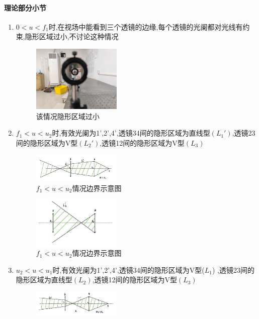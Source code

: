 \documentclass[UTF8]{gapd}
\begin{document}
\paragraph{理论部分小节}
\begin{enumerate}
  \item $0<u<f_1$时,在视场中能看到三个透镜的边缘,每个透镜的光阑都对光线有约束,隐形区域过小,不讨论这种情况
  \begin{figure}[htbp]
    \centering
    \includegraphics[width=0.4\textwidth]{images/11.jpg}
    \caption{该情况隐形区域过小}
    \label{fig:11}
  \end{figure}
  \item $f_1<u<u_2$时,有效光阑为1',2',4',透镜34间的隐形区域为直线型$(L_1')$,透镜23间的隐形区域为V型$(L_2')$,透镜12间的隐形区域为V型$(L_3)$
  \begin{figure}[htbp]
    \centering
    \includegraphics[width=0.4\textwidth]{images/12.jpg}
    \caption{$f_1<u<u_2$情况边界示意图}
    \label{fig:12}
  \end{figure}
  \begin{figure}[htbp]
    \centering
    \includegraphics[width=0.4\textwidth]{images/13.jpg}
    \caption{$f_1<u<u_2$情况边界示意图}
    \label{fig:13}
  \end{figure} 
  \item $u_2<u<u_1$时,有效光阑为1',2',4',透镜34间的隐形区域为V型($L_1$) ,透镜23间的隐形区域为直线型$(L_2)$,透镜12间的隐形区域为V型$(L_3)$
  \begin{figure}[htbp]
    \centering
    \includegraphics[width=0.4\textwidth]{images/14.jpg}

\end{figure}
\end{enumerate}
\end{document}

